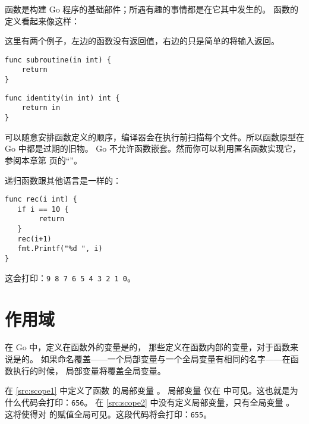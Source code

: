 
\noindent{}函数是构建 Go 程序的基础部件；所遇有趣的事情都是在它其中发生的。
函数的定义看起来像这样：

\showremarks
这里有两个例子，左边的函数没有返回值，右边的只是简单的将输入返回。

\begin{minipage}{.5\textwidth}
\begin{lstlisting}
func subroutine(in int) {
    return
}
\end{lstlisting}
\end{minipage}
\begin{minipage}{.5\textwidth}
\begin{lstlisting}
func identity(in int) int {
    return in
}
\end{lstlisting}
\end{minipage}

可以随意安排函数定义的顺序，编译器会在执行前扫描每个文件。所以函数原型在 Go 中都是过期的旧物。
Go 不允许函数嵌套。然而你可以利用匿名函数实现它，参阅本章第 \pageref{sec:functions as values}
页的``''。


递归函数跟其他语言是一样的：
\begin{lstlisting}[caption=递归函数]
func rec(i int) {
   if i == 10 {
        return
   }
   rec(i+1)
   fmt.Printf("%d ", i)
}
\end{lstlisting}
这会打印：\texttt{9 8 7 6 5 4 3 2 1 0}。
\section{作用域}
在 Go 中，定义在函数外的变量是的，
那些定义在函数内部的变量，对于函数来说是的。
如果命名覆盖——一个局部变量与一个全局变量有相同的名字——在函数执行的时候，
局部变量将覆盖全局变量。

\begin{minipage}{.5\textwidth}

\hfill
\vfill
\end{minipage}
\hfill
\begin{minipage}{.5\textwidth}

\hfill
\vfill
\end{minipage}

在 \ref{src:scope1} 中定义了函数  的局部变量 。
局部变量  仅在  中可见。这也就是为什么代码会打印：\texttt{656}。
在 \ref{src:scope2} 中没有定义局部变量，只有全局变量 。
这将使得对  的赋值全局可见。这段代码将会打印：\texttt{655}。

